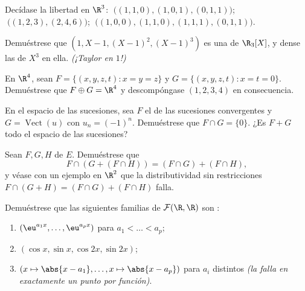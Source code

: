 \begin{exercise}[$\star$]\label{exo:b1:vspaces:3}
Decídase la libertad en $\R^3$: $\;\bigl((1,1,0), (1,0,1),
(0,1,1)\bigr)$; $\;\bigl((1,2,3), (2,4,6)\bigr)$;
$\;\bigl((1,0,0), (1,1,0), (1,1,1), (0,1,1)\bigr)$.
\end{exercise}

\begin{exercise}[$\star$]\label{exo:b1:vspaces:4}
Demuéstrese que $(1, X - 1, (X-1)^2, (X-1)^3)$ es una  de
$\R_3[X]$, y dense las  de $X^3$ en ella. \emph{(¡Taylor
en $1$!)}
\end{exercise}

\begin{exercise}[$\star\star$]\label{exo:b1:vspaces:5}
En $\R^4$, sean $F = \{(x,y,z,t) : x = y = z\}$ y
$G = \{(x,y,z,t) : x = t = 0\}$. Demuéstrese que $F \oplus G = \R^4$
y descompóngase $(1,2,3,4)$ en consecuencia.
\end{exercise}

\begin{exercise}[$\star\star$]\label{exo:b1:vspaces:6}
En el espacio de las sucesiones, sea $F$ el  de las
sucesiones convergentes y $G = \operatorname{Vect}(u)$ con
$u_n = (-1)^n$. Demuéstrese que $F \cap G = \{0\}$. ¿Es $F + G$ todo
el espacio de las sucesiones?
\end{exercise}

\begin{exercise}[$\star\star$]\label{exo:b1:vspaces:7}
Sean $F, G, H$  de $E$. Demuéstrese que
\[
F \cap (G + (F \cap H)) = (F \cap G) + (F \cap H),
\]
y véase con un ejemplo en $\R^2$ que la distributividad sin
restricciones $F \cap (G + H) = (F\cap G) + (F \cap H)$ falla.
\end{exercise}

\begin{exercise}[$\star\star\star$]\label{exo:b1:vspaces:8}
Demuéstrese que las siguientes familias de $\mathcal{F}(\R, \R)$ son :
\begin{enumerate}
  \item $(\eu^{a_1 x}, \dots, \eu^{a_p x})$ para $a_1 < \dots < a_p$;
  \item $(\cos x, \sin x, \cos 2x, \sin 2x)$;
  \item $(x \mapsto \abs{x - a_1}, \dots, x \mapsto \abs{x - a_p})$
        para $a_i$ distintos \emph{(la  falla en
        exactamente un punto por función)}.
\end{enumerate}
\end{exercise}

